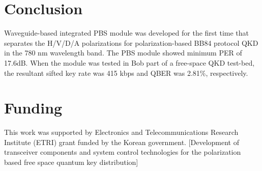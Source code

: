 \documentclass[letterpaper, 10pt]{article}
\begin{document}
\section{Conclusion}
Waveguide-based integrated PBS module was developed for the first time that separates the H/V/D/A polarizations for polarization-based BB84 protocol QKD in the 780 nm wavelength band.
The PBS module showed minimum PER of 17.6dB.
When the module was tested in Bob part of a free-space QKD test-bed, the resultant sifted key rate was 415 kbps and QBER was 2.81\%, respectively.



\section*{Funding}
This work was supported by Electronics and Telecommunications Research Institute (ETRI) grant funded by the Korean government. [Development of transceiver components and system control technologies for the polarization based free space quantum key distribution]
\end{document}

